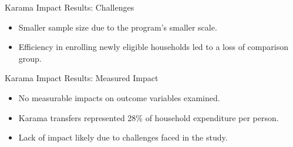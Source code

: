 \documentclass{beamer}
\begin{document}
\begin{frame}{Karama Impact Results: Challenges}
\begin{itemize}
    \item Smaller sample size due to the program's smaller scale.
    \item Efficiency in enrolling newly eligible households led to a loss of comparison group.
\end{itemize}
\end{frame}

\begin{frame}{Karama Impact Results: Measured Impact}
\begin{itemize}
    \item No measurable impacts on outcome variables examined.
    \item Karama transfers represented 28\% of household expenditure per person.
    \item Lack of impact likely due to challenges faced in the study.
\end{itemize}
\end{frame}
\end{document}
